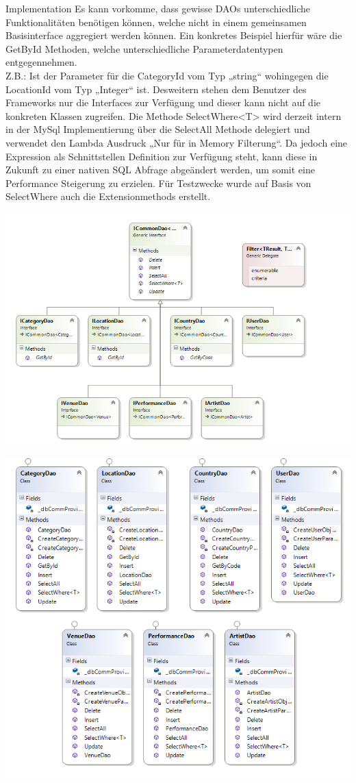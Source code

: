 \begin{section}{Implementation}
Es kann vorkomme, dass gewisse DAOs unterschiedliche Funktionalitäten benötigen können, welche nicht in einem gemeinsamen Basisinterface aggregiert werden können.
Ein konkretes Beispiel hierfür wäre die GetById Methoden, welche unterschiedliche Parameterdatentypen entgegennehmen. \\
Z.B.: Ist der Parameter für die CategoryId vom Typ „string“ wohingegen die LocationId vom Typ „Integer“ ist. Desweitern stehen dem Benutzer des Frameworks nur die Interfaces zur Verfügung und dieser kann nicht auf die konkreten Klassen zugreifen. \nPar
Die Methode SelectWhere<T> wird derzeit intern in der MySql Implementierung über die SelectAll Methode delegiert und verwendet den Lambda Ausdruck „Nur für in Memory Filterung“. Da jedoch eine Expression als Schnittstellen Definition zur Verfügung steht, kann diese in Zukunft zu einer nativen SQL Abfrage abgeändert werden, um somit eine Performance Steigerung zu erzielen. Für Testzwecke wurde auf Basis von SelectWhere auch die Extensionmethods erstellt. 

\includegraphics[angle=0, scale=0.45]{./img/DaoInterfaceClasses.jpg}
\FloatBarrier

\includegraphics[angle=0, scale=0.45]{./img/DaoClasses.jpg}
\FloatBarrier


\end{section}
